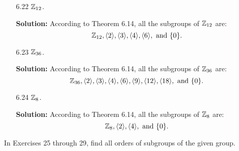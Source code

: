 \begin{enumerate}
   \item[6.22] $\mathbb{Z}_{12}$.

      \textbf{Solution:} According to Theorem 6.14, all the subgroups of
      $\mathbb{Z}_{12}$ are:
      $$\mathbb{Z}_{12}, \langle 2 \rangle, \langle 3 \rangle, \langle 4 \rangle, \langle 6 \rangle, \text{ and } \{0\}.$$
   \item[6.23] $\mathbb{Z}_{36}$.

      \textbf{Solution:} According to Theorem 6.14, all the subgroups of
      $\mathbb{Z}_{36}$ are:
      $$\mathbb{Z}_{36}, \langle 2 \rangle, \langle 3 \rangle, \langle 4 \rangle, \langle 6 \rangle, \langle 9 \rangle, \langle 12 \rangle,
        \langle 18 \rangle, \text{ and } \{0\}.$$
   \item[6.24] $\mathbb{Z}_8$.

      \textbf{Solution:} According to Theorem 6.14, all the subgroups of
      $\mathbb{Z}_{8}$ are:
      $$\mathbb{Z}_{8}, \langle 2 \rangle, \langle 4 \rangle, \text{ and } \{0\}.$$
\end{enumerate}

\noindent      In Exercises 25 through 29, find all orders of subgroups of the
               given group.

